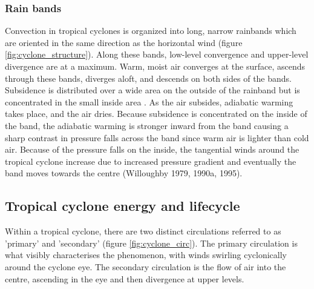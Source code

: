 \subsubsection{Rain bands}
Convection in tropical cyclones is organized into long, narrow rainbands which are oriented in the same direction as the horizontal wind (figure \ref{fig:cyclone_structure}). Along these bands, low-level convergence and upper-level divergence are at a maximum. Warm, moist air converges at the surface, ascends through these bands, diverges aloft, and descends on both sides of the bands. Subsidence is distributed over a wide area on the outside of the rainband but is concentrated in the small inside area \citep{noaa_a11}. As the air subsides, adiabatic warming takes place, and the air dries. Because subsidence is concentrated on the inside of the band, the adiabatic warming is stronger inward from the band causing a sharp contrast in pressure falls across the band since warm air is lighter than cold air. Because of the pressure falls on the inside, the tangential winds around the tropical cyclone increase due to increased pressure gradient and eventually the band moves towards the centre (Willoughby 1979, 1990a, 1995). 




\subsection{Tropical cyclone energy and lifecycle}

Within a tropical cyclone, there are two distinct circulations referred to as 'primary' and 'secondary' (figure \ref{fig:cyclone_circ}). The primary circulation is what visibly characterises the phenomenon, with winds swirling cyclonically around the cyclone eye. The secondary circulation is the flow of air into the centre, ascending in the eye and then divergence at upper levels.


